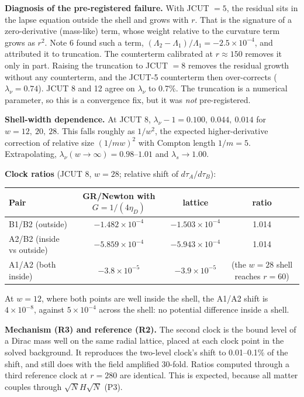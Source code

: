 \documentclass[11pt]{article}
\begin{document}
\textbf{Diagnosis of the pre-registered failure.} With JCUT $=5$, the residual sits in the lapse equation outside the shell and grows with $r$. That is the signature of a zero-derivative (mass-like) term, whose weight relative to the curvature term grows as $r^2$. Note 6 found such a term, $(\Lambda_2-\Lambda_1)/\Lambda_1=-2.5\times10^{-4}$, and attributed it to truncation. The counterterm calibrated at $r\approx150$ removes it only in part. Raising the truncation to JCUT $=8$ removes the residual growth without any counterterm, and the JCUT-5 counterterm then over-corrects ($\lambda_\nu=0.74$). JCUT 8 and 12 agree on $\lambda_\nu$ to 0.7\%. The truncation is a numerical parameter, so this is a convergence fix, but it was \emph{not} pre-registered.

\textbf{Shell-width dependence.} At JCUT 8, $\lambda_\nu-1=0.100,\ 0.044,\ 0.014$ for $w=12,\ 20,\ 28$. This falls roughly as $1/w^2$, the expected higher-derivative correction of relative size $(1/mw)^2$ with Compton length $1/m=5$. Extrapolating, $\lambda_\nu(w\to\infty)=0.98$--$1.01$ and $\lambda_s\to1.00$.

\textbf{Clock ratios} (JCUT 8, $w=28$; relative shift of $d\tau_A/d\tau_B$):
\begin{center}\footnotesize\setlength{\tabcolsep}{4pt}\begin{tabular}{lccc}\toprule
Pair & GR/Newton with $G=1/(4\eta_D)$ & lattice & ratio\\\midrule
B1/B2 (outside) & $-1.482\times10^{-4}$ & $-1.503\times10^{-4}$ & 1.014\\
A2/B2 (inside vs outside) & $-5.859\times10^{-4}$ & $-5.943\times10^{-4}$ & 1.014\\
A1/A2 (both inside) & $-3.8\times10^{-5}$ & $-3.9\times10^{-5}$ & (the $w=28$ shell reaches $r=60$)\\\bottomrule
\end{tabular}\end{center}
At $w=12$, where both points are well inside the shell, the A1/A2 shift is $4\times10^{-8}$, against $5\times10^{-4}$ across the shell: no potential difference inside a shell.

\textbf{Mechanism (R3) and reference (R2).} The second clock is the bound level of a Dirac mass well on the same radial lattice, placed at each clock point in the solved background. It reproduces the two-level clock's shift to 0.01--0.1\% of the shift, and still does with the field amplified 30-fold. Ratios computed through a third reference clock at $r=280$ are identical. This is expected, because all matter couples through $\sqrt N H\sqrt N$ (P3).
\end{document}
